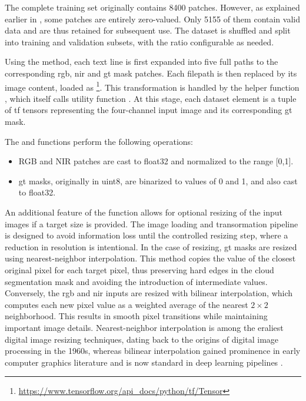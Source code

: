 {The complete training set originally contains 8400 patches. However, as explained earlier in , some patches are entirely zero-valued.
Only 5155 of them contain valid data and are thus retained for subsequent use.
The dataset is shuffled and split into training and validation subsets, with the ratio configurable as needed.

Using the  method, each text line is first expanded into five full paths to the corresponding \gls{rgb}, \gls{nir} and \gls{gt} mask patches.
Each filepath is then replaced by its image content, loaded as \footnote{\url{https://www.tensorflow.org/api_docs/python/tf/Tensor}}.
This transformation is handled by the helper function , which itself calls utility function .
At this stage, each dataset element is a tuple of \gls{tf} tensors representing the four-channel input image and its corresponding \gls{gt} mask.

The  and  functions perform the following operations:

\begin{itemize}
    \item RGB and NIR patches are cast to \gls{float32} and normalized to the range [0,1].
    \item \gls{gt} masks, originally in \gls{uint8}, are binarized to values of 0 and 1, and also cast to \gls{float32}.
\end{itemize}

An additional feature of the  function allows for optional resizing of the input images if a target size is provided.
The image loading and transormation pipeline is designed to avoid information loss until the controlled resizing step, where a reduction in resolution is intentional.
In the case of resizing, \gls{gt} masks are resized using nearest-neighbor interpolation. This method copies the value of the closest original pixel for each target pixel,
thus preserving hard edges in the cloud segmentation mask and avoiding the introduction of intermediate values.
Conversely, the \gls{rgb} and \gls{nir} inputs are resized with bilinear interpolation,
which computes each new pixel value as a weighted average of the nearest $2\times2$ neighborhood. This results in smooth pixel transitions while maintaining important image details.
Nearest-neighbor interpolation is among the eraliest digital image resizing techniques, dating back to the origins of digital image processing in the 1960s,
whereas bilinear interpolation gained prominence in early computer graphics literature and is now standard in deep learning pipelines \cite{bilinearNearest1, bilinearNearest2}.

}
